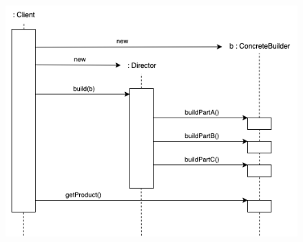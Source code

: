 \begin{figure}[H]
    \centering
    \includegraphics[width=1\linewidth]{assets/pattern/builder/builder-activity.drawio.png}
\end{figure}

\newpage